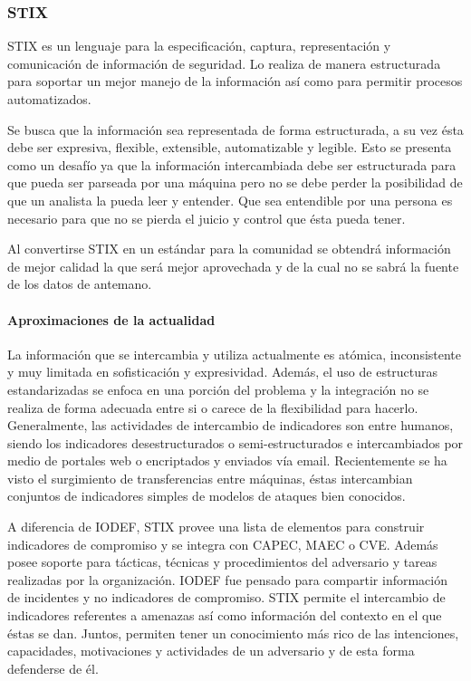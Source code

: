 \subsubsection{STIX}

STIX es un lenguaje para la especificación, captura, representación y 
comunicación de información de seguridad. Lo realiza de manera 
estructurada para soportar un mejor manejo de la información así como para 
permitir procesos automatizados.

Se busca que la información sea representada de forma estructurada, a su vez 
ésta debe ser expresiva, flexible, extensible, automatizable y legible. Esto se 
presenta como un desafío ya que la información intercambiada debe ser 
estructurada para que pueda ser parseada por una máquina pero no se debe perder 
la posibilidad de que un analista la pueda leer y entender. Que sea entendible 
por una persona es necesario para que no se pierda el juicio y control que ésta 
pueda tener.

Al convertirse STIX en un estándar para la comunidad se obtendrá información de 
mejor calidad la que será mejor aprovechada y de la cual no se sabrá la fuente 
de los datos de antemano.

\paragraph{Aproximaciones de la actualidad}

La información que se intercambia y utiliza actualmente es atómica, inconsistente 
y muy limitada en sofisticación y expresividad. Además, el uso de estructuras 
estandarizadas se enfoca en una porción del problema y la integración no se 
realiza de forma adecuada entre si o carece de la flexibilidad para hacerlo. 
Generalmente, las actividades de intercambio de indicadores son entre humanos, 
siendo los indicadores desestructurados o semi-estructurados e intercambiados 
por medio de portales web o encriptados y enviados vía email. Recientemente se 
ha visto el surgimiento de transferencias entre máquinas, éstas intercambian 
conjuntos de indicadores simples de modelos de ataques bien conocidos.

A diferencia de IODEF, STIX provee una lista de elementos para construir 
indicadores de compromiso y se integra con CAPEC, MAEC o CVE. Además posee 
soporte para tácticas, técnicas y procedimientos del adversario y tareas 
realizadas por la organización. IODEF fue pensado para compartir información de 
incidentes y no indicadores de compromiso. STIX permite el intercambio de 
indicadores referentes a amenazas así como información del contexto en el que 
éstas se dan. Juntos, permiten tener un conocimiento más rico de las 
intenciones, capacidades, motivaciones y actividades de un adversario y de esta 
forma defenderse de él.

